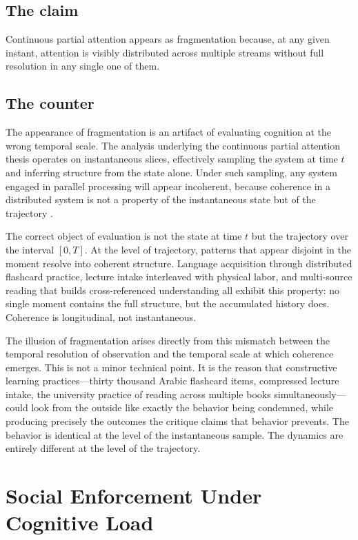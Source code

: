 \documentclass[12pt, a4paper]{article}
\begin{document}
\subsection{The claim}
Continuous partial attention appears as fragmentation because, at any given instant, attention is visibly distributed across multiple streams without full resolution in any single one of them.

\subsection{The counter}
The appearance of fragmentation is an artifact of evaluating cognition at the wrong temporal scale. The analysis underlying the continuous partial attention thesis operates on instantaneous slices, effectively sampling the system at time $t$ and inferring structure from the state alone. Under such sampling, any system engaged in parallel processing will appear incoherent, because coherence in a distributed system is not a property of the instantaneous state but of the trajectory \cite{Wiener1948,Ashby1956}.

The correct object of evaluation is not the state at time $t$ but the trajectory over the interval $[0, T]$. At the level of trajectory, patterns that appear disjoint in the moment resolve into coherent structure. Language acquisition through distributed flashcard practice, lecture intake interleaved with physical labor, and multi-source reading that builds cross-referenced understanding all exhibit this property: no single moment contains the full structure, but the accumulated history does. Coherence is longitudinal, not instantaneous.

The illusion of fragmentation arises directly from this mismatch between the temporal resolution of observation and the temporal scale at which coherence emerges. This is not a minor technical point. It is the reason that constructive learning practices---thirty thousand Arabic flashcard items, compressed lecture intake, the university practice of reading across multiple books simultaneously---could look from the outside like exactly the behavior being condemned, while producing precisely the outcomes the critique claims that behavior prevents. The behavior is identical at the level of the instantaneous sample. The dynamics are entirely different at the level of the trajectory.

\section{Social Enforcement Under Cognitive Load}
\end{document}
